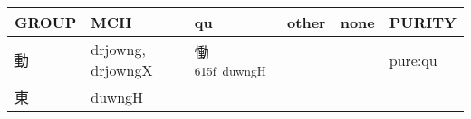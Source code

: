 \documentclass[14pt,a4paper]{scrartcl}
\begin{document}
\begin{longtable}[c]{@{}llllll@{}}
\toprule
\begin{minipage}[b]{0.14\columnwidth}\raggedright\strut
GROUP
\strut\end{minipage} &
\begin{minipage}[b]{0.14\columnwidth}\raggedright\strut
MCH
\strut\end{minipage} &
\begin{minipage}[b]{0.14\columnwidth}\raggedright\strut
qu
\strut\end{minipage} &
\begin{minipage}[b]{0.14\columnwidth}\raggedright\strut
other
\strut\end{minipage} &
\begin{minipage}[b]{0.14\columnwidth}\raggedright\strut
none
\strut\end{minipage} &
\begin{minipage}[b]{0.14\columnwidth}\raggedright\strut
PURITY
\strut\end{minipage}\tabularnewline
\midrule
\endhead
\begin{minipage}[t]{0.14\columnwidth}\raggedright\strut
動
\strut\end{minipage} &
\begin{minipage}[t]{0.14\columnwidth}\raggedright\strut
drjowng, drjowngX
\strut\end{minipage} &
\begin{minipage}[t]{0.14\columnwidth}\raggedright\strut
慟\textsuperscript{615f~duwngH}
\strut\end{minipage} &
\begin{minipage}[t]{0.14\columnwidth}\raggedright\strut
\strut\end{minipage} &
\begin{minipage}[t]{0.14\columnwidth}\raggedright\strut
\strut\end{minipage} &
\begin{minipage}[t]{0.14\columnwidth}\raggedright\strut
pure:qu
\strut\end{minipage}\tabularnewline
\begin{minipage}[t]{0.14\columnwidth}\raggedright\strut
東
\strut\end{minipage} &
\begin{minipage}[t]{0.14\columnwidth}\raggedright\strut
duwngH
\strut\end{minipage} &
\begin{minipage}[t]{0.14\columnwidth}\raggedright\strut
\strut\end{minipage} &

\end{longtable}
\end{document}

